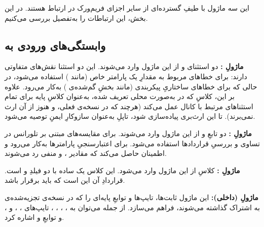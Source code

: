 این سه ماژول با طیفِ گسترده‌ای از سایر اجزای فریم‌ورک در ارتباط هستند. در این بخش، این ارتباطات را به‌تفصیل بررسی می‌کنیم.

\subsection{وابستگی‌های ورودی به }

\textbf{ماژولِ :} دو استثنای  و  از این ماژول وارد می‌شوند. این دو استثنا نقش‌های متفاوتی دارند:  برای خطاهای مربوط به مقدارِ یک پارامتر خاص (مانند ) استفاده می‌شود، در حالی که  برای خطاهای ساختاریِ پیکربندی (مانند بخشِ گم‌شده‌ی ) به‌کار می‌رود. علاوه بر این، کلاسِ  که در  به‌صورت محلی تعریف شده، به‌عنوان کلاسِ پایه برای تمام استثناهای مرتبط با کانال عمل می‌کند (هرچند که در نسخه‌ی فعلی،  و  هنوز از آن ارث نمی‌برند). تا این ارث‌بری پیاده‌سازی شود، تاپلِ  به‌عنوان سازوکارِ ایمنِ  توصیه می‌شود.

\textbf{ماژولِ :} دو تابعِ  و  از این ماژول وارد می‌شوند.  برای مقایسه‌های مبتنی بر تلورانس در تساوی و بررسیِ قراردادها استفاده می‌شود.  برای اعتبارسنجیِ پارامترها به‌کار می‌رود و اطمینان حاصل می‌کند که مقادیر ،  و منفی رد می‌شوند.

\textbf{ماژولِ :} کلاسِ  از این ماژول وارد می‌شود. این کلاس یک  ساده با دو فیلدِ  و  است. قراردادِ آن این است که  باید برقرار باشد.

\textbf{ماژولِ  (داخلی):} این ماژول ثابت‌ها، تایپ‌ها و توابعِ پایه‌ای را که در نسخه‌ی تجزیه‌شده‌ی  به اشتراک گذاشته می‌شوند، فراهم می‌سازد. از جمله می‌توان به ، ، ، ، تایپ‌های ، ،  و ، و توابعِ  و  اشاره کرد.

